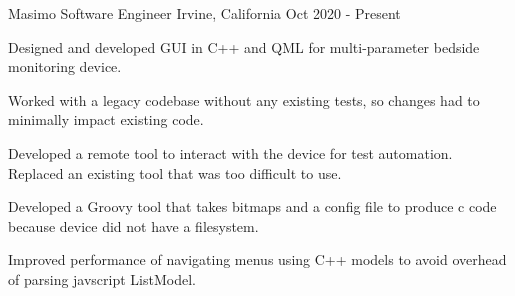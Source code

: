 

\begin{cventries}

\cventry
{Masimo} %
{Software Engineer} %
{Irvine, California} %
{Oct 2020 - Present} %
{
  \begin{cvitems} %
      \item{Designed and developed GUI in C++ and QML for multi-parameter bedside monitoring device.}
      \item{Worked with a legacy codebase without any existing tests, so changes had to minimally impact existing code.}
      \item{Developed a remote tool to interact with the device for test automation. Replaced an existing tool that was too difficult to use. }
      \item{Developed a Groovy tool that takes bitmaps and a config file to produce c code because device did not have a filesystem.}
      \item{Improved performance of navigating menus using C++ models to avoid overhead of parsing javscript ListModel.}
  \end{cvitems}
}


\end{cventries}
